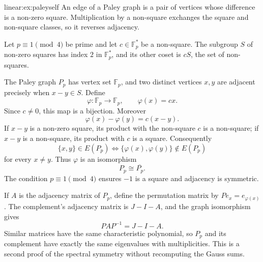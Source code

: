 \begin{solution}{linear:ex:paleyself}
\idea An edge of a Paley graph is a pair of vertices whose difference is a non-zero square. Multiplication by a non-square exchanges the square and non-square classes, so it reverses adjacency.

\writeup Let $p\equiv1\pmod4$ be prime and let $c\in\mathbb F_p^*$ be a non-square. The subgroup $S$ of non-zero squares has index $2$ in $\mathbb F_p^*$, and its other coset is $cS$, the set of non-squares.

The Paley graph $P_p$ has vertex set $\mathbb F_p$, and two distinct vertices $x,y$ are adjacent precisely when $x-y\in S$. Define
\[
\varphi:\mathbb F_p\to\mathbb F_p,\qquad\varphi(x)=cx.
\]
Since $c\ne0$, this map is a bijection. Moreover
\[
\varphi(x)-\varphi(y)=c(x-y).
\]
If $x-y$ is a non-zero square, its product with the non-square $c$ is a non-square; if $x-y$ is a non-square, its product with $c$ is a square. Consequently
\[
\{x,y\}\in E(P_p)
\iff
\{\varphi(x),\varphi(y)\}\notin E(P_p)
\]
for every $x\ne y$. Thus $\varphi$ is an isomorphism
\[
\boxed{P_p\cong\overline{P_p}}.
\]
The condition $p\equiv1\pmod4$ ensures $-1$ is a square and adjacency is symmetric.

If $A$ is the adjacency matrix of $P_p$, define the permutation matrix by
$Pe_x=e_{\varphi(x)}$. The complement's adjacency matrix is $J-I-A$, and
the graph isomorphism gives
\[
PAP^{-1}=J-I-A.
\]
Similar matrices have the same characteristic polynomial, so $P_p$ and its complement have exactly the same eigenvalues with multiplicities. This is a second proof of the spectral symmetry without recomputing the Gauss sums.
\end{solution}


